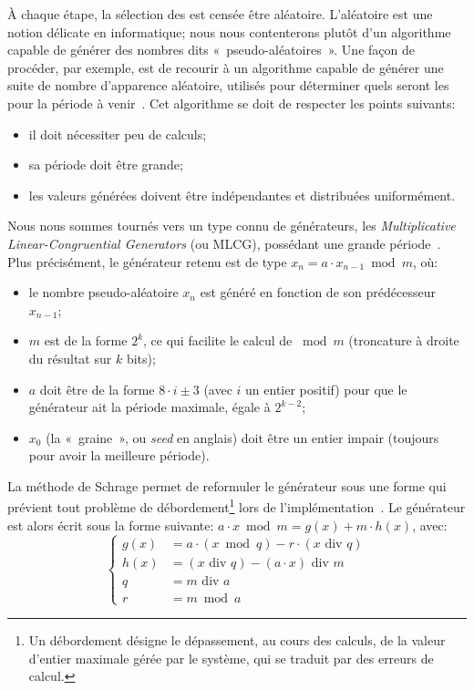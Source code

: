 À chaque étape, la sélection des \cns est censée être aléatoire.
L'aléatoire est une notion délicate en informatique; nous nous contenterons plutôt d'un algorithme capable de générer des nombres dits «~pseudo-aléatoires~».
Une façon de procéder, par exemple, est de recourir à un algorithme capable de générer une suite de nombre d'apparence aléatoire, utilisés pour déterminer quels seront les \cns pour la période à venir~\cite{GMT12}.
Cet algorithme se doit de respecter les points suivants:
\begin{itemize}
    \item il doit nécessiter peu de calculs;
    \item sa période doit être grande;
    \item les valeurs générées doivent être indépendantes et distribuées uniformément.
\end{itemize}
Nous nous sommes tournés vers un type connu de générateurs, les \textit{Multiplicative Linear-Congruential Generators} (ou MLCG), possédant une grande période~\cite{RJ91}.
Plus précisément, le générateur retenu est de type $x_n = a\cdot x_{n-1}\bmod m$, où:
\begin{itemize}
    \item le nombre pseudo-aléatoire $x_n$ est généré en fonction de son prédécesseur $x_{n-1}$;
    \item $m$ est de la forme $2^k$, ce qui facilite le calcul de $\bmod m$ (troncature à droite du résultat sur $k$ bits);
    \item $a$ doit être de la forme $8\cdot i\pm3$ (avec $i$ un entier positif) pour que le générateur ait la période maximale, égale à $2^{k-2}$;
    \item $x_0$ (la «~graine~», ou \textit{seed} en anglais) doit être un entier impair (toujours pour avoir la meilleure période).
\end{itemize}
La méthode de Schrage permet de reformuler le générateur sous une forme qui prévient tout problème de débordement\footnote{Un débordement désigne le dépassement, au cours des calculs, de la valeur d'entier maximale gérée par le système, qui se traduit par des erreurs de calcul.} lors de l'implémentation~\cite{RJ91}.
Le générateur est alors écrit sous la forme suivante: $a\cdot x\bmod m=g(x)+m\cdot h(x)$, avec:
\[\left\{
    \begin{aligned}
        g(x) & =a\cdot(x\bmod q)-r\cdot(x\mbox{~div~}q)\\
        h(x) & =(x\mbox{~div~}q)-(a\cdot x)\mbox{~div~}m\\
        q    & =m\mbox{~div~}a\\
        r    & =m\bmod a
    \end{aligned}
\right.\]
